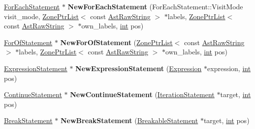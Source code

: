 \begin{DoxyCompactItemize}
\mbox{\hyperlink{classv8_1_1internal_1_1ForEachStatement}{For\+Each\+Statement}} $\ast$ {\bfseries New\+For\+Each\+Statement} (For\+Each\+Statement\+::\+Visit\+Mode visit\+\_\+mode, \mbox{\hyperlink{classv8_1_1internal_1_1ZoneList}{Zone\+Ptr\+List}}$<$ const \mbox{\hyperlink{classv8_1_1internal_1_1AstRawString}{Ast\+Raw\+String}} $>$ $\ast$labels, \mbox{\hyperlink{classv8_1_1internal_1_1ZoneList}{Zone\+Ptr\+List}}$<$ const \mbox{\hyperlink{classv8_1_1internal_1_1AstRawString}{Ast\+Raw\+String}} $>$ $\ast$own\+\_\+labels, \mbox{\hyperlink{classint}{int}} pos)
\item 
\mbox{\label{classv8_1_1internal_1_1AstNodeFactory_ae8f7bd61c0fc39f7c8883f985f785cd2}} 
\mbox{\hyperlink{classv8_1_1internal_1_1ForOfStatement}{For\+Of\+Statement}} $\ast$ {\bfseries New\+For\+Of\+Statement} (\mbox{\hyperlink{classv8_1_1internal_1_1ZoneList}{Zone\+Ptr\+List}}$<$ const \mbox{\hyperlink{classv8_1_1internal_1_1AstRawString}{Ast\+Raw\+String}} $>$ $\ast$labels, \mbox{\hyperlink{classv8_1_1internal_1_1ZoneList}{Zone\+Ptr\+List}}$<$ const \mbox{\hyperlink{classv8_1_1internal_1_1AstRawString}{Ast\+Raw\+String}} $>$ $\ast$own\+\_\+labels, \mbox{\hyperlink{classint}{int}} pos)
\item 
\mbox{\label{classv8_1_1internal_1_1AstNodeFactory_a0193a0eb8d7135dd712c7b709c224ee7}} 
\mbox{\hyperlink{classv8_1_1internal_1_1ExpressionStatement}{Expression\+Statement}} $\ast$ {\bfseries New\+Expression\+Statement} (\mbox{\hyperlink{classv8_1_1internal_1_1Expression}{Expression}} $\ast$expression, \mbox{\hyperlink{classint}{int}} pos)
\item 
\mbox{\label{classv8_1_1internal_1_1AstNodeFactory_a90ed10dc732e8ef7441708882769fd06}} 
\mbox{\hyperlink{classv8_1_1internal_1_1ContinueStatement}{Continue\+Statement}} $\ast$ {\bfseries New\+Continue\+Statement} (\mbox{\hyperlink{classv8_1_1internal_1_1IterationStatement}{Iteration\+Statement}} $\ast$target, \mbox{\hyperlink{classint}{int}} pos)
\item 
\mbox{\label{classv8_1_1internal_1_1AstNodeFactory_adec15f39a4f875929e109ce3aebd0803}} 
\mbox{\hyperlink{classv8_1_1internal_1_1BreakStatement}{Break\+Statement}} $\ast$ {\bfseries New\+Break\+Statement} (\mbox{\hyperlink{classv8_1_1internal_1_1BreakableStatement}{Breakable\+Statement}} $\ast$target, \mbox{\hyperlink{classint}{int}} pos)

\end{DoxyCompactItemize}
